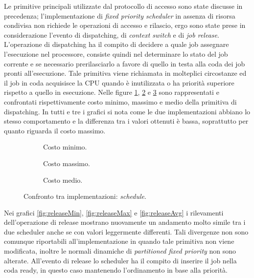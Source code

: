 \noindent Le primitive principali utilizzate dal protocollo di accesso sono state discusse in precedenza; l'implementazione di \textit{fixed priority scheduler} in assenza di risorsa condivisa non richiede le operazioni di accesso e rilascio, ergo sono state prese in considerazione l'evento di dispatching, di \textit{context switch} e di \textit{job release}.\\

\noindent L'operazione di dispatching ha il compito di decidere a quale job assegnare l'esecuzione nel processore, consiste quindi nel determinare lo stato del job corrente e se necessario prerilasciarlo a favore di quello in testa alla coda dei job pronti all'esecuzione. Tale primitiva viene richiamata in molteplici circostanze ed il job in coda acquisisce la CPU quando è inutilizzata o ha priorità superiore rispetto a quello in esecuzione. Nelle figure \ref{fig:schedMin}, \ref{fig:schedMax} e \ref{fig:schedAvg} sono rappresentati e confrontati rispettivamente costo minimo, massimo e medio della primitiva di dispatching. In tutti e tre i grafici si nota come le due implementazioni abbiano lo stesso comportamento e la differenza tra i valori ottenuti è bassa, soprattutto per quanto riguarda il costo massimo.\\

  \begin{figure}[htb]
    \centering
      \begin{subfigure}[b]{0.49\textwidth}
        \centering
        \resizebox{\linewidth}{!}\graficoSchedMIN  
        \caption{Costo minimo.}
        \label{fig:schedMin}
      \end{subfigure}
      \begin{subfigure}[b]{0.49\textwidth}
        \centering
        \resizebox{\linewidth}{!}\graficoSchedMAX
        \caption{Costo massimo.}
        \label{fig:schedMax}
      \end{subfigure}
      \begin{subfigure}[b]{0.49\textwidth}
        \centering
        \resizebox{\linewidth}{!}\graficoSchedAVG
        \caption{Costo medio.}
        \label{fig:schedAvg}
      \end{subfigure}

    \caption{Confronto tra implementazioni: \textit{schedule}.}
    \label{fig:sched}
  \end{figure}

\noindent Nei grafici \ref{fig:releaseMin}, \ref{fig:releaseMax} e \ref{fig:releaseAvg} i rilevamenti dell'operazione di release mostrano nuovamente un andamento molto simile tra i due scheduler anche se con valori leggermente differenti. Tali divergenze non sono comunque riportabili all'implementazione in quando tale primitiva non viene modificata, inoltre le normali dinamiche di \textit{partitioned fixed priority} non sono alterate. All'evento di release lo scheduler ha il compito di inserire il job nella coda ready, in questo caso mantenendo l'ordinamento in base alla priorità.\\

